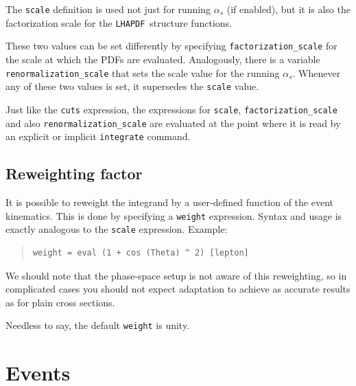 \documentclass[12pt]{book}
\newcommand{\ttt}[1]{\texttt{#1}}
\newcommand{\lhapdf}{\ttt{LHAPDF}}
\begin{document}
The \ttt{scale} definition is used not just for running $\alpha_s$ (if
enabled), but it is also the factorization scale for the \lhapdf\ structure
functions.

These two values can be set differently by specifying
\ttt{factorization\_scale} for the scale at which the PDFs are
evaluated. Analogously, there is a variable
\ttt{renormalization\_scale} that sets the scale value for the running
$\alpha_s$. Whenever any of these two values is set, it supersedes the
\ttt{scale} value.

Just like the \ttt{cuts} expression, the expressions for \ttt{scale},
\ttt{factorization\_scale} and also \ttt{renormalization\_scale}
are evaluated at the point where it is read by an explicit or implicit
\ttt{integrate} command.


\subsection{Reweighting factor}

It is possible to reweight the integrand by a user-defined function of the
event kinematics.  This is done by specifying a \ttt{weight} expression.
Syntax and usage is exactly analogous to the \ttt{scale} expression.  Example:
\begin{quote}
\begin{footnotesize}
\begin{verbatim}
weight = eval (1 + cos (Theta) ^ 2) [lepton]
\end{verbatim}
\end{footnotesize}
\end{quote}
We should note that the phase-space setup is not aware of this reweighting, so
in complicated cases you should not expect adaptation to achieve as accurate
results as for plain cross sections.

Needless to say, the default \ttt{weight} is unity.


\section{Events}
\end{document}
